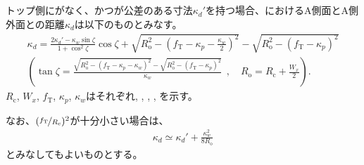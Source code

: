 \subsection{\KeywayDepthDimension}
トップ側に\Outcut がなく、かつ\AsideKeywayDepth が公差のある寸法$\kappa_d'$を持つ場合、\KeywayCenter における\Keyway A側面とA側外面との距離$\kappa_d$は以下のものとみなす。
\begin{gather*}
  \kappa_d
  = \frac{2\kappa_d'-\kappa_w\sin\zeta}{1+\cos^2\zeta}\cos\zeta
    +\sqrt{R_\mathrm o^2-\left(f_\mathrm T-\kappa_p-\frac{\kappa_w}2\right)^2}
    -\sqrt{R_\mathrm o^2-\left(f_\mathrm T-\kappa_p\right)^2}\\[3pt]
  \left(
  \tan\zeta
  = \frac{\sqrt{R_\mathrm o^2-\left(f_\mathrm T-\kappa_p-\kappa_w\right)^2}
          -\sqrt{R_\mathrm o^2-\left(f_\mathrm T-\kappa_p\right)^2}}
         {\kappa_w}
    ~~, \quad
    R_\mathrm o = R_\mathrm c+\frac{W_x}2
  \right).
\end{gather*}
$R_\mathrm c$, $W_x$, $f_\mathrm T$, $\kappa_p$, $\kappa_w$はそれぞれ\CenterCurvatureRadius, \OuterDiameter, \TopAlocationLength, \KeywayPos, \KeywayWidth を示す。

なお、$(\nicefrac{f_\mathrm T}{R_\mathrm c})^2$が十分小さい場合は、
\begin{align*}
  \kappa_d \simeq \kappa_d'+\frac{\kappa_w^2}{8R_\mathrm o}
\end{align*}
とみなしてもよいものとする。



\clearpage


\subsection{\EndFaceCChamferMillingReferencePoint}

